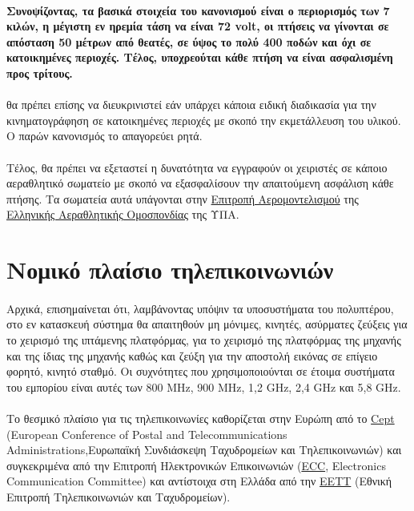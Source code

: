 \documentclass[a4paper, 12pt, twoside]{report}
\begin{document}
{{{{{{			\paragraph{}{\textbf{Συνοψίζοντας, τα βασικά στοιχεία του κανονισμού είναι ο περιορισμός των 7 κιλών, η μέγιστη εν ηρεμία τάση να είναι 72 volt, οι πτήσεις να γίνονται σε απόσταση 50 μέτρων από θεατές, σε ύψος το πολύ 400 ποδών και όχι σε κατοικημένες περιοχές. Τέλος, υποχρεούται κάθε πτήση να είναι ασφαλισμένη προς τρίτους.}
			}
			\paragraph{}{θα πρέπει επίσης να διευκρινιστεί εάν υπάρχει κάποια ειδική διαδικασία για την κινηματογράφηση σε κατοικημένες περιοχές με σκοπό την εκμετάλλευση του υλικού. Ο παρών κανονισμός το απαγορεύει ρητά.
			}
			\paragraph{}{Τέλος, θα πρέπει να εξεταστεί η δυνατότητα να εγγραφούν οι χειριστές σε κάποιο αεραθλητικό σωματείο με σκοπό να εξασφαλίσουν την απαιτούμενη ασφάλιση κάθε πτήσης. Τα σωματεία αυτά υπάγονται στην \href{http://epae.elao.gr/}{Επιτροπή Αερομοντελισμού} της \href{http://www.elao.gr/web/index.html}{Ελληνικής Αεραθλητικής Ομοσπονδίας} της ΥΠΑ.
			}			
			
			
		\section{Νομικό πλαίσιο τηλεπικοινωνιών}		
			
			\paragraph{}{Αρχικά, επισημαίνεται ότι, λαμβάνοντας υπόψιν τα υποσυστήματα του πολυπτέρου, στο εν κατασκευή σύστημα θα απαιτηθούν μη μόνιμες, κινητές, ασύρματες ζεύξεις για το χειρισμό της ιπτάμενης πλατφόρμας, για το χειρισμό της πλατφόρμας της μηχανής και της ίδιας της μηχανής καθώς και ζεύξη για την αποστολή εικόνας σε επίγειο φορητό, κινητό σταθμό. Οι συχνότητες που χρησιμοποιούνται σε έτοιμα συστήματα του εμπορίου είναι αυτές των 800 MHz, 900 MHz, 1,2 GHz, 2,4 GHz και 5,8 GHz.
			}
			
			\paragraph{}{Το θεσμικό πλαίσιο για τις τηλεπικοινωνίες καθορίζεται στην Ευρώπη από το \href{http://www.cept.org/cept}{Cept} (European Conference of Postal and Telecommunications Administrations,Ευρωπαϊκή
Συνδιάσκεψη Ταχυδρομείων και Τηλεπικοινωνιών) και συγκεκριμένα από την Επιτροπή Ηλεκτρονικών Επικοινωνιών (\href{http://www.cept.org/ecc}{ECC}, Electronics Communication Committee) και αντίστοιχα στη Ελλάδα από την \href{http://www.eett.gr/opencms/opencms/EETT/}{ΕΕΤΤ} (Εθνική Επιτροπή Τηλεπικοινωνιών και Ταχυδρομείων).
			}
			
}}}}}}
\end{document}
